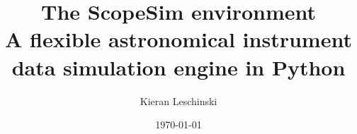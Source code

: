 \documentclass[a4paper,twoside,11pt]{article}
\providecommand*{\DUdocumentsubtitle}[1]{{\large #1}}
\begin{document}
\title{The ScopeSim environment%
  \label{the-scopeSim-environment}%
  \\%
  \DUdocumentsubtitle{A flexible astronomical instrument data simulation engine in Python}%
  \label{subtitle}}
\author{Kieran Leschinski}
\date{\today}

\maketitle

















\end{document}
